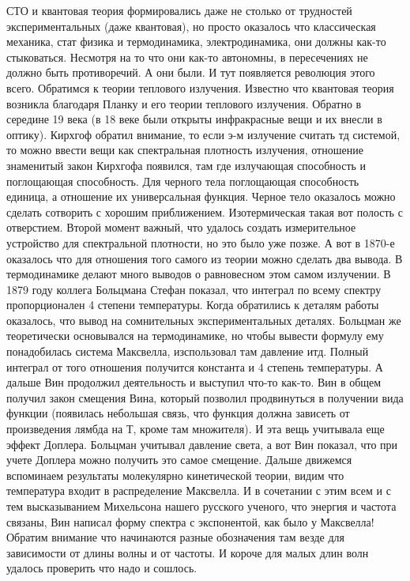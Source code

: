 \documentclass[a4paper, 12pt]{article}
\begin{document}
СТО и квантовая теория формировались даже не столько от трудностей 
экспериментальных (даже квантовая), но просто оказалось что классическая 
механика, стат физика и термодинамика, электродинамика, они должны 
как-то стыковаться. Несмотря на то что они как-то автономны, 
в пересечениях не должно быть противоречий. А они были. И тут появляется 
революция этого всего. Обратимся к теории теплового излучения. Известно 
что квантовая теория возникла благодаря Планку и его теории теплового 
излучения. Обратно в середине 19 века (в 18 веке были открыты 
инфракрасные вещи и их внесли в оптику). Кирхгоф обратил внимание, то 
если э-м излучение считать тд системой, то можно ввести вещи как 
спектральная плотность излучения, отношение знаменитый закон Кирхгофа 
появился, там где излучающая способность и поглощающая способность. Для 
черного тела поглощающая способность единица, а отношение их 
универсальная функция. Черное тело оказалось можно сделать сотворить 
с хорошим приближением. Изотермическая такая вот полость с отверстием. 
Второй момент важный, что удалось создать измерительное устройство для 
спектральной плотности, но это было уже позже. А вот в 1870-е оказалось 
что для отношения того самого из теории можно сделать два вывода. 
В термодинамике делают много выводов о равновесном этом самом излучении. 
В 1879 году коллега Больцмана Стефан показал, что интеграл по всему 
спектру пропорционален 4 степени температуры. Когда обратились к деталям 
работы оказалось, что вывод на сомнительных экспериментальных деталях. 
Больцман же теоретически основывался на термодинамике, но чтобы вывести 
формулу ему понадобилась система Максвелла, изспользовал там давление 
итд. Полный интеграл от того отношения получится константа и 4 степень 
температуры. А дальше Вин продолжил деятельность и выступил что-то 
как-то. Вин в общем получил закон смещения Вина, который позволил 
продвинуться в получении вида функции (появилась небольшая связь, что 
функция должна зависеть от произведения лямбда на Т, кроме там 
множителя). И эта вещь учитывала еще эффект Доплера. Больцман учитывал 
давление света, а вот Вин показал, что при учете Доплера можно получить 
это самое смещение. Дальше движемся вспоминаем результаты молекулярно 
кинетической теории, видим что температура входит в распределение 
Максвелла. И в сочетании с этим всем и с тем высказыванием Михельсона 
нашего русского ученого, что энергия и частота связаны, Вин написал 
форму спектра с экспонентой, как было у Максвелла! Обратим внимание что 
начинаются разные обозначения там везде для зависимости от длины волны 
и от частоты. И короче для малых длин волн удалось проверить что надо 
и сошлось.
\end{document}
